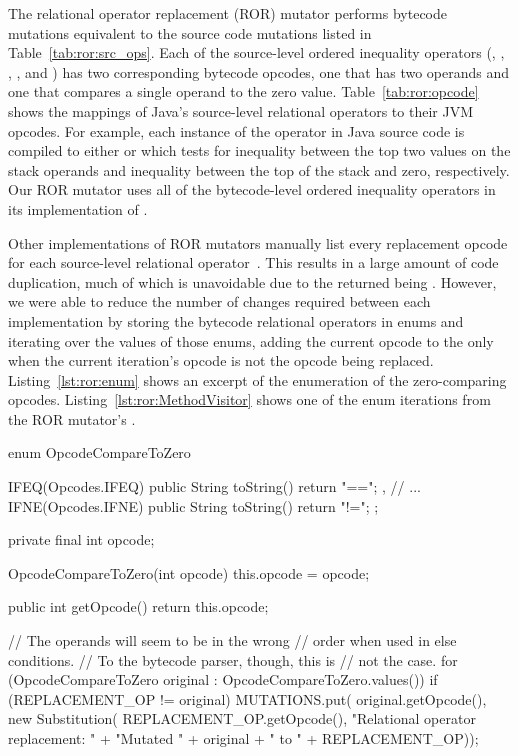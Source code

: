 The relational operator replacement (ROR) mutator performs bytecode mutations equivalent to the source code mutations listed in Table~\ref{tab:ror:src_ops}.
Each of the source-level ordered inequality operators (\java{>}, \java{>=}, \java{==}, \java{<=}, and \java{<}) has two corresponding bytecode opcodes, one that has two operands and one that compares a single operand to the zero value.
Table~\ref{tab:ror:opcode} shows the mappings of Java's source-level relational operators to their JVM opcodes.
For example, each instance of the \java{!=} operator in Java source code is compiled to either  or  which tests for inequality between the top two values on the stack operands and inequality between the top of the stack and zero, respectively.
Our ROR mutator uses all of the bytecode-level ordered inequality operators in its implementation of .

Other implementations of ROR mutators manually list every replacement opcode for each source-level relational operator~\cite{ProdigyXable}.
This results in a large amount of code duplication, much of which is unavoidable due to the  returned being .
However, we were able to reduce the number of changes required between each implementation by storing the bytecode relational operators in enums and iterating over the values of those enums, adding the current opcode to the  only when the current iteration's opcode is not the opcode being replaced.
Listing~\ref{lst:ror:enum} shows an excerpt of the enumeration of the zero-comparing opcodes.
Listing~\ref{lst:ror:MethodVisitor} shows one of the enum iterations from the ROR mutator's .

\begin{Java}[%
  caption={Excerpt of \java{enum} Declaration for ROR},
  label={lst:ror:enum}]
enum OpcodeCompareToZero {
  IFEQ(Opcodes.IFEQ) {
    public String toString() {
      return "==";
    }
  },
  // ...
  IFNE(Opcodes.IFNE) {
    public String toString() {
      return "!=";
    }
  };

  private final int opcode;

  OpcodeCompareToZero(int opcode) {
    this.opcode = opcode;
  }

  public int getOpcode() {
    return this.opcode;
  }
}
\end{Java}

\begin{Java}[%
  caption={Excerpt of ROR's \java{MethodVisitor}},
  label={lst:ror:MethodVisitor}]
// The operands will seem to be in the wrong
// order when used in else conditions.
// To the bytecode parser, though, this is
// not the case.
for (OpcodeCompareToZero original
    : OpcodeCompareToZero.values()) {
  if (REPLACEMENT_OP != original) {
    MUTATIONS.put(
      original.getOpcode(),
      new Substitution(
        REPLACEMENT_OP.getOpcode(),
        "Relational operator replacement: "
        + "Mutated " + original
        + " to " + REPLACEMENT_OP));
  }
}
\end{Java}
